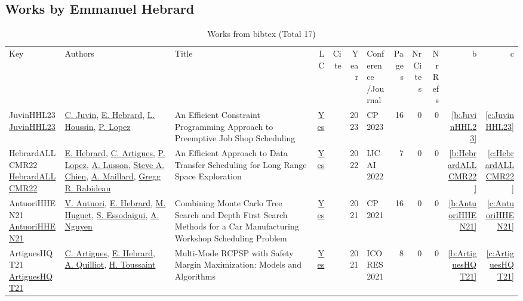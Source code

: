 \subsection{Works by Emmanuel Hebrard}
\label{sec:a1}
{\scriptsize
\begin{longtable}{>{\raggedright\arraybackslash}p{3cm}>{\raggedright\arraybackslash}p{6cm}>{\raggedright\arraybackslash}p{6.5cm}rrrp{2.5cm}rrrrr}
\rowcolor{white}\caption{Works from bibtex (Total 17)}\\ \toprule
\rowcolor{white}Key & Authors & Title & LC & Cite & Year & \shortstack{Conference\\/Journal} & Pages & \shortstack{Nr\\Cites} & \shortstack{Nr\\Refs} & b & c \\ \midrule\endhead
\bottomrule
\endfoot
JuvinHHL23 \href{https://doi.org/10.4230/LIPIcs.CP.2023.19}{JuvinHHL23} & \hyperref[auth:a0]{C. Juvin}, \hyperref[auth:a1]{E. Hebrard}, \hyperref[auth:a2]{L. Houssin}, \hyperref[auth:a3]{P. Lopez} & An Efficient Constraint Programming Approach to Preemptive Job Shop Scheduling & \href{works/JuvinHHL23.pdf}{Yes} & \cite{JuvinHHL23} & 2023 & CP 2023 & 16 & 0 & 0 & \ref{b:JuvinHHL23} & \ref{c:JuvinHHL23}\\
HebrardALLCMR22 \href{https://doi.org/10.24963/ijcai.2022/643}{HebrardALLCMR22} & \hyperref[auth:a1]{E. Hebrard}, \hyperref[auth:a6]{C. Artigues}, \hyperref[auth:a3]{P. Lopez}, \hyperref[auth:a797]{A. Lusson}, \hyperref[auth:a798]{Steve A. Chien}, \hyperref[auth:a799]{A. Maillard}, \hyperref[auth:a800]{Gregg R. Rabideau} & An Efficient Approach to Data Transfer Scheduling for Long Range Space Exploration & \href{works/HebrardALLCMR22.pdf}{Yes} & \cite{HebrardALLCMR22} & 2022 & IJCAI 2022 & 7 & 0 & 0 & \ref{b:HebrardALLCMR22} & \ref{c:HebrardALLCMR22}\\
AntuoriHHEN21 \href{https://doi.org/10.4230/LIPIcs.CP.2021.14}{AntuoriHHEN21} & \hyperref[auth:a53]{V. Antuori}, \hyperref[auth:a1]{E. Hebrard}, \hyperref[auth:a54]{M. Huguet}, \hyperref[auth:a55]{S. Essodaigui}, \hyperref[auth:a56]{A. Nguyen} & Combining Monte Carlo Tree Search and Depth First Search Methods for a Car Manufacturing Workshop Scheduling Problem & \href{works/AntuoriHHEN21.pdf}{Yes} & \cite{AntuoriHHEN21} & 2021 & CP 2021 & 16 & 0 & 0 & \ref{b:AntuoriHHEN21} & \ref{c:AntuoriHHEN21}\\
ArtiguesHQT21 \href{https://doi.org/10.5220/0010190101290136}{ArtiguesHQT21} & \hyperref[auth:a6]{C. Artigues}, \hyperref[auth:a1]{E. Hebrard}, \hyperref[auth:a801]{A. Quilliot}, \hyperref[auth:a802]{H. Toussaint} & Multi-Mode {RCPSP} with Safety Margin Maximization: Models and Algorithms & \href{works/ArtiguesHQT21.pdf}{Yes} & \cite{ArtiguesHQT21} & 2021 & ICORES 2021 & 8 & 0 & 0 & \ref{b:ArtiguesHQT21} & \ref{c:ArtiguesHQT21}\\

\end{longtable}}
